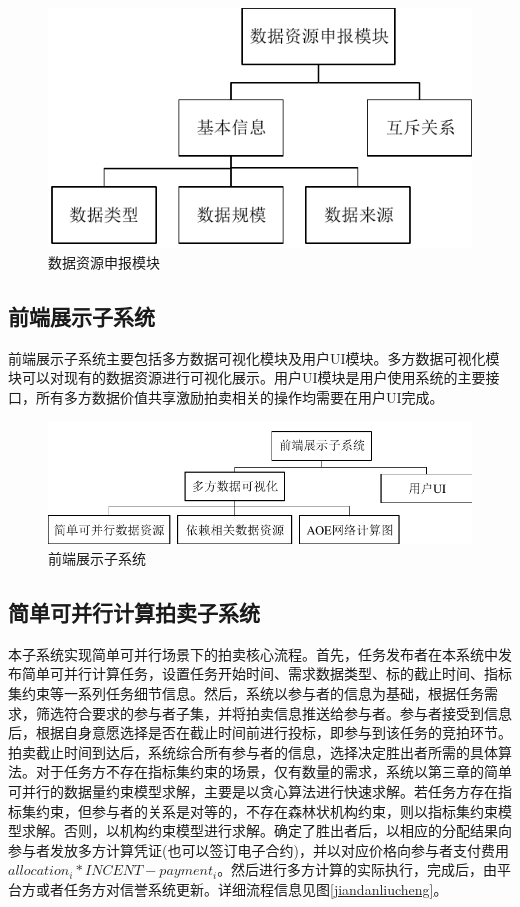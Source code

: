 \documentclass[promaster]{thesis-uestc}
\begin{document}
\begin{figure}[H]
    \includegraphics{pic/application.pdf}
    \caption{数据资源申报模块}
\end{figure}

\subsection{前端展示子系统}
前端展示子系统主要包括多方数据可视化模块及用户UI模块。多方数据可视化模块可以对现有的数据资源进行可视化展示。用户UI模块是用户使用系统的主要接口，所有多方数据价值共享激励拍卖相关的操作均需要在用户UI完成。

\begin{figure}[h]
    \includegraphics{pic/qianduan.pdf}
    \caption{前端展示子系统}
\end{figure}

\FloatBarrier

\subsection{简单可并行计算拍卖子系统}
本子系统实现简单可并行场景下的拍卖核心流程。首先，任务发布者在本系统中发布简单可并行计算任务，设置任务开始时间、需求数据类型、标的截止时间、指标集约束等一系列任务细节信息。然后，系统以参与者的信息为基础，根据任务需求，筛选符合要求的参与者子集，并将拍卖信息推送给参与者。参与者接受到信息后，根据自身意愿选择是否在截止时间前进行投标，即参与到该任务的竞拍环节。拍卖截止时间到达后，系统综合所有参与者的信息，选择决定胜出者所需的具体算法。对于任务方不存在指标集约束的场景，仅有数量的需求，系统以第三章的简单可并行的数据量约束模型求解，主要是以贪心算法进行快速求解。若任务方存在指标集约束，但参与者的关系是对等的，不存在森林状机构约束，则以指标集约束模型求解。否则，以机构约束模型进行求解。确定了胜出者后，以相应的分配结果向参与者发放多方计算凭证(也可以签订电子合约)，并以对应价格向参与者支付费用$allocation_i*INCENT-payment_i$。然后进行多方计算的实际执行，完成后，由平台方或者任务方对信誉系统更新。详细流程信息见图\ref{jiandanliucheng}。
\end{document}
